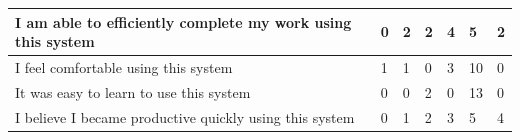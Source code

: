 \begin{center}
{\begin{tabular}{|l|l|l|l|l|l|l|}
I am able to efficiently complete my work using this system & 0                                                            & 2        & 2       & 4     & 5                                                         & 2                                                         \\ \hline
I feel comfortable using this system                        & 1                                                            & 1        & 0       & 3     & 10                                                        & 0                                                         \\ \hline
It was easy to learn to use this system                     & 0                                                            & 0        & 2       & 0     & 13                                                        & 0                                                         \\ \hline
I believe I became productive quickly using this system     & 0                                                            & 1        & 2       & 3     & 5                                                         & 4                                                         \\ \hline
\end{tabular}
}
\end{center}
\vspace{1cm}



